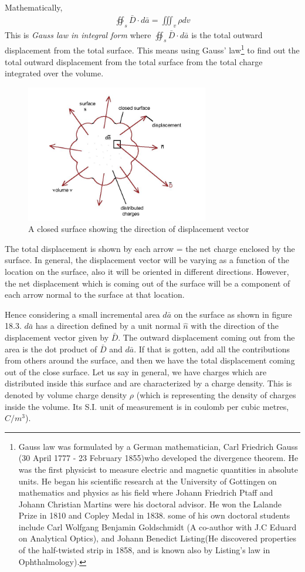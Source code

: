 Mathematically, 
\begin{align}
\boxed{\oiint_s\bar{D}\cdot{d\bar{a}} = \iiint_v\rho dv}
\end{align}
This is \emph{Gauss law in integral form} where $\oiint_s\bar{D}\cdot d\bar{a}$ is the total outward displacement from the total surface. This means using Gauss' law\footnote{
Gauss law was formulated by a German mathematician, Carl Friedrich Gauss (30 April 1777 - 23 February 1855)who developed the divergence theorem. He was the first physicist to measure electric and magnetic quantities in absolute units. He began his scientific research at the University of Gottingen on mathematics and physics as his field where Johann Friedrich Ptaff and Johann Christian Martins were his doctoral advisor. He won the Lalande Prize in 1810 and Copley Medal in 1838. some of his own doctoral students include Carl Wolfgang Benjamin Goldschmidt (A co-author with J.C Eduard on Analytical Optics), and Johann Benedict Listing(He discovered properties of the half-twisted strip in 1858, and is known also by Listing's law in Ophthalmology).
} to find out the total outward displacement from the total surface from the total charge integrated over the volume.
\begin{figure}[h]
\centering
\includegraphics[height=6cm]{./graphics/g}
\caption{A closed surface showing the direction of displacement vector}
\label{fig:g}
\end{figure}

The total displacement is shown by each arrow = the net charge enclosed by the surface. In general, the displacement vector will be varying as a function of the location on the surface, also it will be oriented in different directions. However, the net displacement which is coming out of the surface will be a component of each arrow normal to the surface at that location.

Hence considering a small incremental area $ d\bar{a} $ on the surface as shown in figure 18.3. $ d\bar{a} $ has a direction defined by a unit normal $ \hat{n} $ with the direction of the displacement vector given by $ \bar{D} $. The outward displacement coming out from the area is the dot product of $ \bar{D} $ and $ d\bar{a} $. If that is gotten, add all the contributions from others around the surface, and then we have the total displacement coming out of the close surface. Let us say in general, we have charges which are distributed inside this surface and are characterized by a charge density. This is denoted by volume charge density $ \rho $ (which is representing the density of charges inside the volume. Its S.I. unit of measurement is in coulomb per cubic metres, $ C/m^{3} $).

